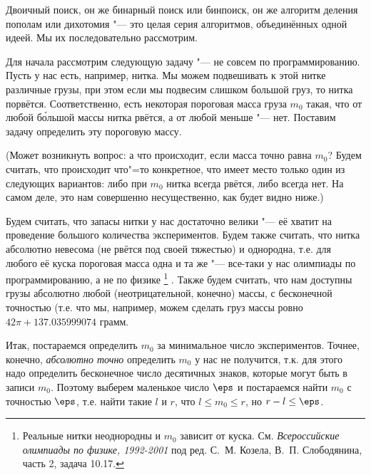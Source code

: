 

Двоичный поиск, он же бинарный поиск или бинпоиск, он же алгоритм деления пополам или дихотомия "--- это целая серия алгоритмов, объединённых одной идеей. 
Мы их последовательно рассмотрим.


Для начала рассмотрим следующую задачу "--- не совсем по программированию. Пусть у нас есть, например, нитка. 
Мы можем подвешивать к этой нитке различные грузы, при этом если мы подвесим слишком большой груз, то нитка порвётся. 
Соответственно, есть некоторая пороговая масса груза $m_0$ такая, что от любой б\'{о}льшой массы нитка рвётся, а от любой меньше "--- нет.
Поставим задачу определить эту пороговую массу.

(Может возникнуть вопрос: а что происходит, если масса точно равна $m_0$? 
Будем считать, что происходит что"=то конкретное, что имеет место только один из следующих вариантов: либо при $m_0$ нитка всегда рвётся, либо всегда нет.
На самом деле, это нам совершенно несущественно, как будет видно ниже.)

Будем считать, что запасы нитки у нас достаточно велики "--- её хватит на проведение большого количества экспериментов.
Будем также считать, что нитка абсолютно невесома (не рвётся под своей тяжестью) и однородна, 
т.е. для любого её куска пороговая масса одна и та же "--- все-таки у нас олимпиады по программированию, а не по физике%
\footnote{Реальные нитки неоднородны и $m_0$ зависит от куска. 
См. \textit{Всероссийские олимпиады по физике, 1992-2001} под ред. С.~М. Козела, В.~П. Слободянина, часть 2, задача 10.17.}%
.
Также будем считать, что нам доступны грузы абсолютно любой (неотрицательной, конечно) массы, с бесконечной точностью 
(т.е. что мы, например, можем сделать груз массы ровно $42\pi+137.035999074$ грамм.

Итак, постараемся определить $m_0$ за минимальное число экспериментов. 
Точнее, конечно, \textit{абсолютно точно} определить $m_0$ у нас не получится, т.к. для этого надо определить бесконечное число десятичных знаков, 
которые могут быть в записи $m_0$. 
Поэтому выберем маленькое число $\eps$ и постараемся найти $m_0$ с точностью $\eps$, 
т.е. найти такие $l$ и $r$, что $l\leq m_0\leq r$, но $r-l\leq \eps$.


